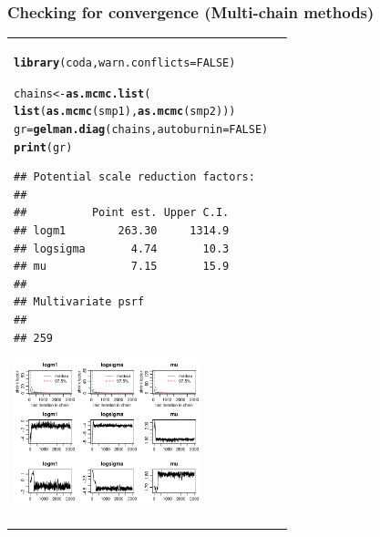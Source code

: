 \documentclass{beamer}\usepackage[]{graphicx}\usepackage[]{color}
\makeatletter
\newcommand{\hlnum}[1]{\textcolor[rgb]{0.686,0.059,0.569}{#1}}%
\newcommand{\hlstd}[1]{\textcolor[rgb]{0.345,0.345,0.345}{#1}}%
\newcommand{\hlkwb}[1]{\textcolor[rgb]{0.69,0.353,0.396}{#1}}%
\newcommand{\hlkwc}[1]{\textcolor[rgb]{0.333,0.667,0.333}{#1}}%
\newcommand{\hlkwd}[1]{\textcolor[rgb]{0.737,0.353,0.396}{\textbf{#1}}}%
\newenvironment{kframe}{%
 \def\at@end@of@kframe{}%
 \ifinner\ifhmode%
  \def\at@end@of@kframe{\end{minipage}}%
  \begin{minipage}{\columnwidth}%
 \fi\fi%
 \def\FrameCommand##1{\hskip\@totalleftmargin \hskip-\fboxsep
 \colorbox{shadecolor}{##1}\hskip-\fboxsep
     \hskip-\linewidth \hskip-\@totalleftmargin \hskip\columnwidth}%
 \MakeFramed {\advance\hsize-\width
   \@totalleftmargin\z@ \linewidth\hsize
   \@setminipage}}%
 {\par\unskip\endMakeFramed%
 \at@end@of@kframe}
\newenvironment{knitrout}{}{} %
\makeatother
\begin{document}
\begin{frame}[fragile]
\sffamily
\frametitle{Checking for convergence (Multi-chain methods)}


\begin{center}
\hspace{-0.9cm}
\begin{tabular}{lr}
\begin{minipage}{5.5cm}





\begin{knitrout}\tiny
\definecolor{shadecolor}{rgb}{0.969, 0.969, 0.969}\color{fgcolor}\begin{kframe}
\begin{alltt}
\hlkwd{library}\hlstd{(coda,} \hlkwc{warn.conflicts} \hlstd{=} \hlnum{FALSE}\hlstd{)}

\hlstd{chains} \hlkwb{<-} \hlkwd{as.mcmc.list}\hlstd{(}
    \hlkwd{list}\hlstd{(}\hlkwd{as.mcmc}\hlstd{(smp1),} \hlkwd{as.mcmc}\hlstd{(smp2)))}
\hlstd{gr} \hlkwb{=} \hlkwd{gelman.diag}\hlstd{(chains,} \hlkwc{autoburnin} \hlstd{=} \hlnum{FALSE}\hlstd{)}
\hlkwd{print}\hlstd{(gr)}
\end{alltt}
\begin{verbatim}
## Potential scale reduction factors:
## 
##          Point est. Upper C.I.
## logm1        263.30     1314.9
## logsigma       4.74       10.3
## mu             7.15       15.9
## 
## Multivariate psrf
## 
## 259
\end{verbatim}
\end{kframe}
\end{knitrout}

\end{minipage}
\begin{minipage}{5.5cm}
\includegraphics[width=5.4cm,angle=0]{plots/bliss-gelman-rubin.pdf}
\end{minipage}
\end{tabular}
\end{center}
\end{frame}
\end{document}
